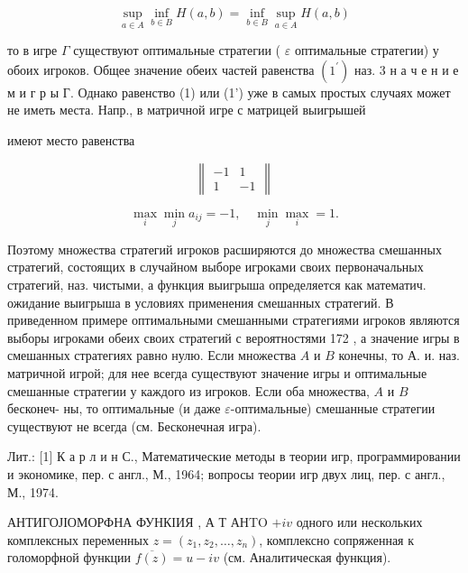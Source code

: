 \documentclass[10pt]{article}
\begin{document}
\[

\sup _{a \in A} \inf _{b \in B} H(a, b)=\inf _{b \in B} \sup _{a \in A} H(a, b)

\]



то в игре $\Gamma$ существуют оптимальные стратегии ( $\varepsilon$ оптимальные стратегии) у обоих игроков. Общее значение обеих частей равенства $\left(1^{\prime}\right)$ наз. 3 н а ч е н и е м и г р ы Г. Однако равенство (1) или (1') уже в самых простых случаях может не иметь места. Напр., в матричной игре с матрицей выигрышей



имеют место равенства



\[

\left\|\begin{array}{rr}

-1 & 1 \\

1 & -1

\end{array}\right\|

\]



\[

\max _{i} \min _{j} a_{i j}=-1, \quad \min _{j} \max _{i}=1 .

\]



Поэтому множества стратегий игроков расширяются до множества смешанных стратегий, состоящих в случайном выборе игроками своих первоначальных стратегий, наз. чистыми, а функция выигрыша определяется как математич. ожидание выигрыша в условиях применения смешанных стратегий. В приведенном примере оптимальными смешанными стратегиями игроков являются выборы игроками обеих своих стратегий с вероятностями 172 , а значение игры в смешанных стратегиях равно нулю. Если множества $A$ и $B$ конечны, то А. и. наз. матричной игрой; для нее всегда существуют значение игры и оптимальные смешанные стратегии у каждого из игроков. Если оба множества, $A$ и $B$ бесконеч- ны, то оптимальные (и даже $\varepsilon$-оптимальные) смешанные стратегии существуют не всегда (см. Бесконечная игра).



Лит.: [1] К а р л и н С., Математические методы в теории игр, программировании и экономике, пер. с англ., М., 1964; вопросы теории игр двух лиц, пер. с англ., М., 1974.



АНТИГОЈІОМОРФНА ФУНКІИЯ , А Т АНTO $+i v$ одного или нескольких комплексных переменных $z=\left(z_{1}, z_{2}, \ldots, z_{n}\right)$, комплексно сопряженная к голоморфной функции $\overline{f(z)}=u-i v$ (см. Аналитическая функция).
\end{document}
